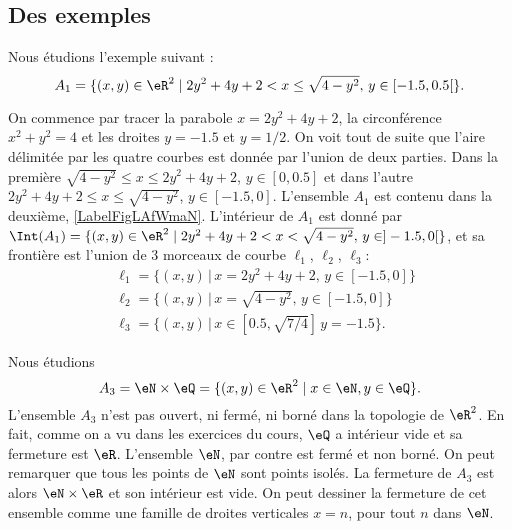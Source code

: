 

\subsection{Des exemples}


\begin{example}
	Nous étudions l'exemple suivant :
	\begin{equation}
		A_1 = \{ (x, y ) \in \eR^2 \; | \; 2y^2+4y+2<x\leq \sqrt{4- y^2},\, y\in [-1.5, 0.5[ \}.
	\end{equation}

	On commence par tracer la parabole $x=2y^2+4y+2$, la circonférence $x^2+y^2=4$ et les droites $y=-1.5$ et $y=1/2$. On voit tout de suite que l'aire délimitée par les quatre courbes est donnée par l'union de deux parties. Dans la première $\sqrt{4- y^2}\leq x\leq 2y^2+4y+2$, $y\in [0,0.5]$ et dans l'autre $2y^2+4y+2\leq x\leq \sqrt{4- y^2}$, $y\in [-1.5, 0]$. L'ensemble $A_1$ est contenu dans la deuxième, \ref{LabelFigLAfWmaN}. L'intérieur de $A_1$ est donné par $\Int(A_1) = \{ (x, y ) \in \eR^2 \; | \; 2y^2+4y+2<x< \sqrt{4- y^2},\, y\in ]-1.5, 0[ \}$, et sa frontière est l'union de 3 morceaux de courbe $\ell_1$, $\ell_2$, $\ell_3$:
	\begin{equation}
		\begin{aligned}
			 & \ell_1=\{(x,y)\, |\, x=2y^2+4y+2,\, y\in [-1.5, 0] \}    \\
			 & \ell_2=\{(x,y)\, |\, x=\sqrt{4-y^2},\, y\in [-1.5, 0] \} \\
			 & \ell_3=\{(x,y)\, |\, x\in [0.5, \sqrt{7/4}]\, y=-1.5 \}.
		\end{aligned}
	\end{equation}

	\newcommand{\CaptionFigLAfWmaN}{}
	
\end{example}

\begin{example}
	Nous étudions
	\begin{equation}
		A_3 = \eN \times \eQ = \{ (x, y ) \in \eR^2 \; | \; x \in \eN , y \in \eQ \}.
	\end{equation}
	L'ensemble $A_3$ n'est pas ouvert, ni fermé, ni borné dans la topologie de $\eR^2$. En fait, comme on a vu dans les exercices du cours, $\eQ$ a intérieur vide et sa fermeture est $\eR$. L'ensemble $\eN$, par contre est fermé et non borné. On peut remarquer que tous les points de $\eN$ sont points isolés. La fermeture de $A_3$ est alors $\eN\times \eR$ et son intérieur est vide. On peut dessiner la fermeture de cet ensemble comme une famille de droites verticales $x=n$, pour tout $n$ dans $\eN$.
\end{example}


